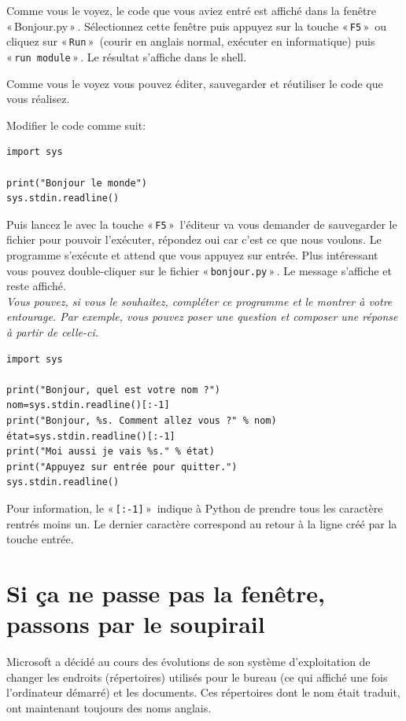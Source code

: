 Comme vous le voyez, le code que vous aviez entré est affiché dans la fenêtre « Bonjour.py » . Sélectionnez cette fenêtre puis appuyez sur la touche « \texttt{F5} »  ou cliquez sur « \texttt{Run} »  (courir en anglais normal, exécuter en informatique) puis « \texttt{run module} » . Le résultat s'affiche dans le shell.

Comme vous le voyez vous pouvez éditer, sauvegarder et réutiliser le code que vous réalisez.

Modifier le code comme suit: 

\begin{Verbatim}[frame=single,rulecolor=\color{mbleu}, label=à taper]
import sys

print("Bonjour le monde")
sys.stdin.readline()
\end{Verbatim}

Puis lancez le avec la touche « \texttt{F5} »  l'éditeur va vous demander de sauvegarder le fichier pour pouvoir l'exécuter, répondez oui car c'est ce que nous voulons. Le programme s'exécute et attend que vous appuyez sur entrée. Plus intéressant vous pouvez double-cliquer sur le fichier « \texttt{bonjour.py} » . Le message s'affiche et reste affiché. \\

\emph{Vous pouvez, si vous le souhaitez, compléter ce programme et le montrer à votre entourage. Par exemple, vous pouvez poser une question et composer une réponse à partir de celle-ci.}\\

\begin{Verbatim}[frame=single,rulecolor=\color{mbleu}, label=à taper]
import sys

print("Bonjour, quel est votre nom ?")
nom=sys.stdin.readline()[:-1]
print("Bonjour, %s. Comment allez vous ?" % nom)
état=sys.stdin.readline()[:-1]
print("Moi aussi je vais %s." % état)
print("Appuyez sur entrée pour quitter.")
sys.stdin.readline()
\end{Verbatim}

Pour information, le « \texttt{[:-1]} »   indique à Python de prendre tous les caractère rentrés moins un. Le dernier caractère correspond au retour à la ligne créé par la touche entrée.


\section{Si ça ne passe pas la fenêtre, passons par le soupirail}
Microsoft a décidé au cours des évolutions de son système d'exploitation de changer les endroits (répertoires) utilisés pour le bureau (ce qui affiché une fois l'ordinateur démarré) et les documents. Ces répertoires dont le nom était traduit, ont maintenant toujours des noms anglais.

